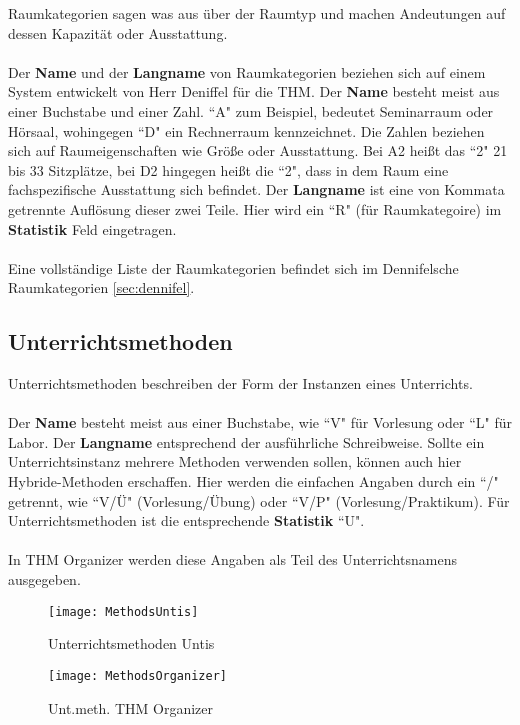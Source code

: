 Raumkategorien sagen was aus über der Raumtyp und machen Andeutungen auf dessen Kapazität oder Ausstattung.\\
\\
Der \textbf{Name} und der \textbf{Langname} von Raumkategorien beziehen sich auf einem System entwickelt von Herr Deniffel für die THM. Der \textbf{Name} besteht meist aus einer Buchstabe und einer Zahl. ``A" zum Beispiel, bedeutet Seminarraum oder Hörsaal, wohingegen ``D" ein Rechnerraum kennzeichnet. Die Zahlen beziehen sich auf Raumeigenschaften wie Größe oder Ausstattung. Bei A2 heißt das ``2" 21 bis 33 Sitzplätze, bei D2 hingegen heißt die ``2", dass in dem Raum eine fachspezifische Ausstattung sich befindet. Der \textbf{Langname} ist eine von Kommata getrennte Auflösung dieser zwei Teile. Hier wird ein ``R" (für Raumkategoire) im \textbf{Statistik} Feld eingetragen.\\
\\
Eine vollständige Liste der Raumkategorien befindet sich im Dennifelsche Raumkategorien \ref{sec:dennifel}.

\newpage
\subsection{Unterrichtsmethoden}

Unterrichtsmethoden beschreiben der Form der Instanzen eines Unterrichts.\\
\\
Der \textbf{Name} besteht meist aus einer Buchstabe, wie ``V" für Vorlesung oder ``L" für Labor. Der \textbf{Langname} entsprechend der ausführliche Schreibweise. Sollte ein Unterrichtsinstanz mehrere Methoden verwenden sollen, können auch hier Hybride-Methoden erschaffen. Hier werden die einfachen Angaben durch ein ``/" getrennt, wie ``V/Ü" (Vorlesung/Übung) oder ``V/P" (Vorlesung/Praktikum). Für Unterrichtsmethoden ist die entsprechende \textbf{Statistik} ``U".\\
\\
In THM Organizer werden diese Angaben als Teil des Unterrichtsnamens ausgegeben.

\begin{figure}[htbp]
	\begin{minipage}{0.5\linewidth} 
		\centering
		\texttt{[image: MethodsUntis]}
		\vspace{-5pt}
		\caption{Unterrichtsmethoden Untis}
		\label{fig:methoden-untis}
	\end{minipage}
	\begin{minipage}{0.5\linewidth}
		\centering
		\texttt{[image: MethodsOrganizer]}
		\caption{Unt.meth. THM Organizer}
		\label{fig:methoden-organizer}
	\end{minipage}
\end{figure}


